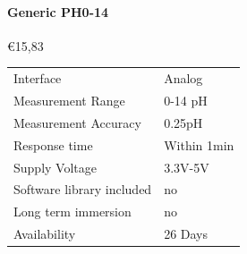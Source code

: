 \paragraph{Generic PH0-14}\mbox{€15,83} \cite{PH0-14}
\begin{table}[h!]
	\centering
	\quad
	\begin{tabular}{| l | l |}
    \hline
    Interface & Analog \\
    Measurement Range & 0-14 pH \\
    Measurement Accuracy &  0.25pH \\
    Response time & Within 1min \\
    Supply Voltage & 3.3V-5V \\
    Software library included & no \\
    Long term immersion & no \\
    Availability & 26 Days \\
    \hline
	\end{tabular}
\end{table}



